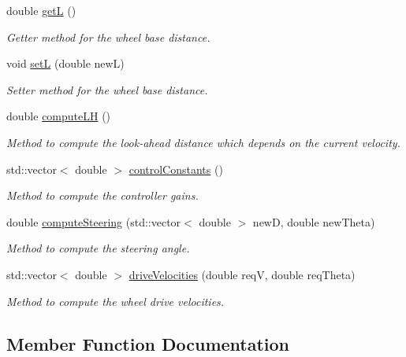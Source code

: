 \begin{DoxyCompactItemize}
double \hyperlink{classAckermannController_aed1eecb5f719ec0a7f6f026c761f9618}{getL} ()
\begin{DoxyCompactList}\small\item\em Getter method for the wheel base distance. \end{DoxyCompactList}\item 
void \hyperlink{classAckermannController_aa783c1211c2a3f0ad8724b6fc0b044b5}{setL} (double newL)
\begin{DoxyCompactList}\small\item\em Setter method for the wheel base distance. \end{DoxyCompactList}\item 
double \hyperlink{classAckermannController_a01af0ebf2941568250268bce6f2e29be}{compute\+LH} ()
\begin{DoxyCompactList}\small\item\em Method to compute the look-\/ahead distance which depends on the current velocity. \end{DoxyCompactList}\item 
std\+::vector$<$ double $>$ \hyperlink{classAckermannController_a31a2ce94c8043f66e6d6445f591c83ae}{control\+Constants} ()
\begin{DoxyCompactList}\small\item\em Method to compute the controller gains. \end{DoxyCompactList}\item 
double \hyperlink{classAckermannController_a587d56dc9b18e806361ebbd0c3556998}{compute\+Steering} (std\+::vector$<$ double $>$ newD, double new\+Theta)
\begin{DoxyCompactList}\small\item\em Method to compute the steering angle. \end{DoxyCompactList}\item 
std\+::vector$<$ double $>$ \hyperlink{classAckermannController_a02b041637eacfb1df1770e45d00297bf}{drive\+Velocities} (double reqV, double req\+Theta)
\begin{DoxyCompactList}\small\item\em Method to compute the wheel drive velocities. \end{DoxyCompactList}\end{DoxyCompactItemize}


\subsection{Member Function Documentation}

